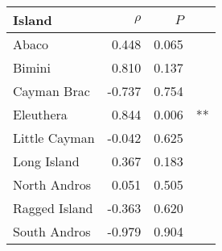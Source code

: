 
\begin{tabular}{lrrl}
\toprule
Island & $\rho$ & $P$ & \\
\midrule
Abaco & 0.448 & 0.065 & \\
Bimini & 0.810 & 0.137 & \\
Cayman Brac & -0.737 & 0.754 & \\
Eleuthera & 0.844 & 0.006 & **\\
Little Cayman & -0.042 & 0.625 & \\
Long Island & 0.367 & 0.183 & \\
North Andros & 0.051 & 0.505 & \\
Ragged Island & -0.363 & 0.620 & \\
South Andros & -0.979 & 0.904 & \\
\bottomrule
\end{tabular}